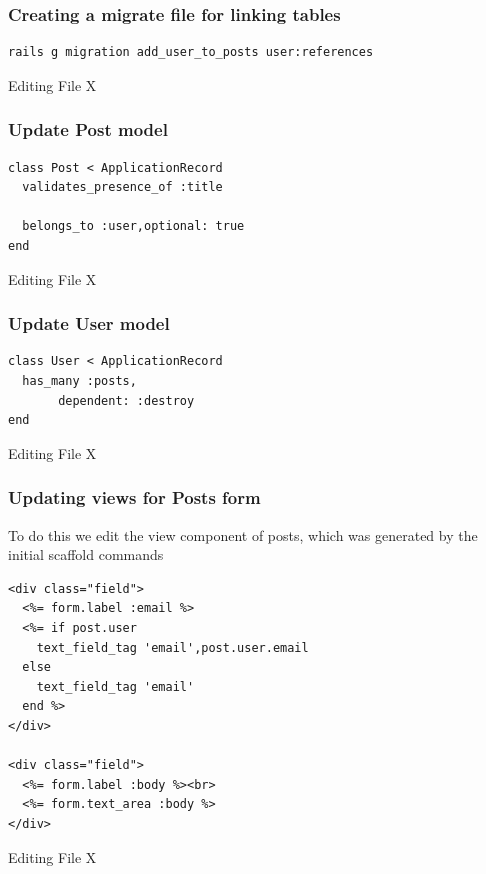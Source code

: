 \documentclass[a4paper]{article}
\begin{document}
\subsubsection{Creating a migrate file for linking tables}
\label{sec-2-6-2}
\begin{listing}[H]
\begin{verbatim}
rails g migration add_user_to_posts user:references
\end{verbatim}
\caption{Editing File X}
\end{listing}

\subsubsection{Update Post model}
\label{sec-2-6-3}
\begin{listing}[H]
\begin{verbatim}
class Post < ApplicationRecord
  validates_presence_of :title

  belongs_to :user,optional: true
end
\end{verbatim}
\caption{Editing File X}
\end{listing}
\subsubsection{Update User model}
\label{sec-2-6-4}
\begin{listing}[H]
\begin{verbatim}
class User < ApplicationRecord
  has_many :posts,
	   dependent: :destroy
end
\end{verbatim}
\caption{Editing File X}
\end{listing}


\subsubsection{Updating views for Posts form}
\label{sec-2-6-5}
To do this we edit the view component of posts, which was generated by the initial scaffold commands
\begin{listing}[H]
\begin{verbatim}
<div class="field">
  <%= form.label :email %>
  <%= if post.user
    text_field_tag 'email',post.user.email
  else
    text_field_tag 'email'
  end %>
</div>

<div class="field">
  <%= form.label :body %><br>
  <%= form.text_area :body %>
</div>
\end{verbatim}
\caption{Editing File X}
\end{listing}
\end{document}
